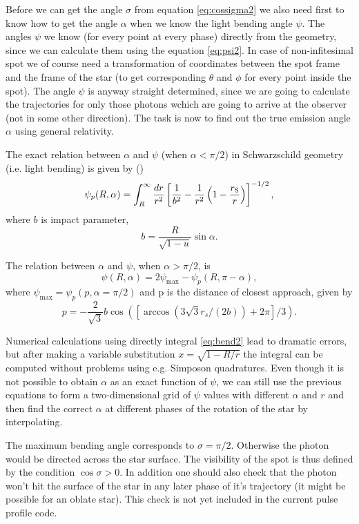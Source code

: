 \documentclass{wihuri}
\def\rg{r_{\rm S}} %
\def\be{\begin{equation}}
\def\ee{\end{equation}}
\def\rg{r_{\rm S}} %
\begin{document}
Before we can get the angle $\sigma$ from equation \ref{eq:cossigma2} we also need first to know how to get the angle $\alpha$ when we know the light bending angle $\psi$. The angles $\psi$ we know (for every point at every phase) directly from the geometry, since we can calculate them using the equation \ref{eq:psi2}. In case of non-infitesimal spot we of course need a  transformation of coordinates between the spot frame and the frame of the star (to get corresponding $\theta$ and $\phi$ for every point inside the spot). The angle $\psi$ is anyway straight determined, since we are going to calculate the trajectories for only those photons wchich are going to arrive at the observer (not in some other direction). The task is now to find out the true emission angle $\alpha$ using general relativity. 

The exact relation between $\alpha$ and $\psi$ (when $\alpha < \pi/2$) in Schwarzschild geometry (i.e. light bending) is given by (\cite{mtw}) %
\be \label{eq:bend2}
  \psi_{p}(R,\alpha)=\int_R^{\infty} \frac{dr}{r^2} \left[ \frac{1}{b^2} -
       \frac{1}{r^2}\left( 1- \frac{\rg}{r}\right)\right]^{-1/2} ,
\ee
where $b$ is impact parameter,
\be \label{eq:impact2}
  b=\frac{R}{\sqrt{1-u}} \sin\alpha .
\ee



The relation between  $\alpha$ and $\psi$, when $\alpha > \pi/2$, is 
\be 
\psi(R,\alpha)=2\psi_{\max}-\psi_{p}(R,\pi-\alpha),
\ee 
where $\psi_{\max} = \psi_{p}(p,\alpha=\pi/2)$ and p is the distance of closest approach, given by
\be
p = -\frac{2}{\sqrt{3}}b\cos([\arccos(3\sqrt{3}r_{s}/(2b))+2\pi]/3).
\ee


Numerical calculations using directly integral \ref{eq:bend2} lead to dramatic errors, but after making a variable substitution $x = \sqrt{1-R/r}$ the integral can be computed without problems using e.g. Simposon quadratures. Even though it is not possible to obtain $\alpha$ as an exact function of $\psi$, we can still use the previous equations to form a two-dimensional grid of $\psi$ values with different $\alpha$ and $r$ and then find the correct $\alpha$ at different phases of the rotation of the star by interpolating. 



The maximum bending angle corresponds to $\sigma=\pi/2$. Otherwise the photon would be directed across the star surface. 
The visibility of the spot is thus defined by the condition $\cos \sigma>0$. In addition one should also check that the photon won't hit the surface of the star in any later phase of it's trajectory (it might be possible for an oblate star). This check is not yet included in the current pulse profile code.
\end{document}
